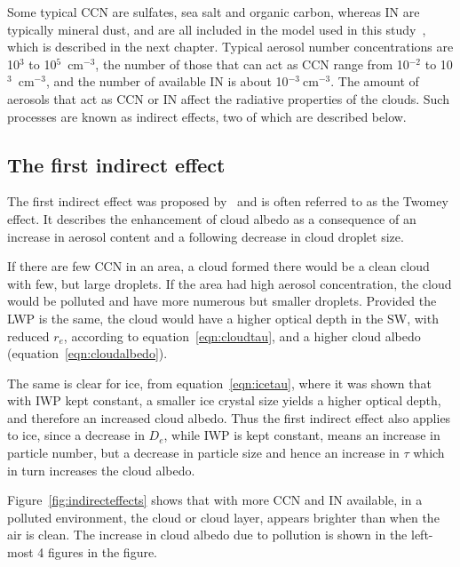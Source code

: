 Some typical CCN are sulfates, sea salt and organic carbon, whereas IN are typically mineral dust, and are all included in the model used in this study~\citep{Thompson2014}, which is described in the next chapter. Typical aerosol number concentrations are 10$^3$ to 10$^5$~$\text{cm}^{-3}$, the number of those that can act as CCN range from 10$^{-2}$ to 10$^3$~$\text{cm}^{-3}$, and the number of available IN is about 10$^{-3}~\text{cm}^{-3}$. The amount of aerosols that act as CCN or IN affect the radiative properties of the clouds. Such processes are known as indirect effects, two of which are described below.
 
\subsection{The first indirect effect}
The first indirect effect was proposed by~\citet{Twomey1974} and is often referred to as the Twomey effect. It describes the enhancement of cloud albedo as a consequence of an increase in aerosol content and a following decrease in cloud droplet size.

If there are few CCN in an area, a cloud formed there would be a clean cloud with few, but large droplets. If the area had high aerosol concentration, the cloud would be polluted and have more numerous but smaller droplets. Provided the LWP is the same, the cloud would have a higher optical depth in the SW, with reduced $r_e$, according to equation~\ref{eqn:cloudtau}, and a higher cloud albedo (equation~\ref{eqn:cloudalbedo}).

The same is clear for ice, from equation~\ref{eqn:icetau}, where it was shown that with IWP kept constant, a smaller ice crystal size yields a higher optical depth, and therefore an increased cloud albedo. Thus the first indirect effect also applies to ice, since a decrease in $D_e$, while IWP is kept constant, means an increase in particle number, but a decrease in particle size and hence an increase in $\tau$ which in turn increases the cloud albedo.

Figure~\ref{fig:indirecteffects} shows that with more CCN and IN available, in a polluted environment, the cloud or cloud layer, appears brighter than when the air is clean. The increase in cloud albedo due to pollution is shown in the left-most 4 figures in the figure. 

